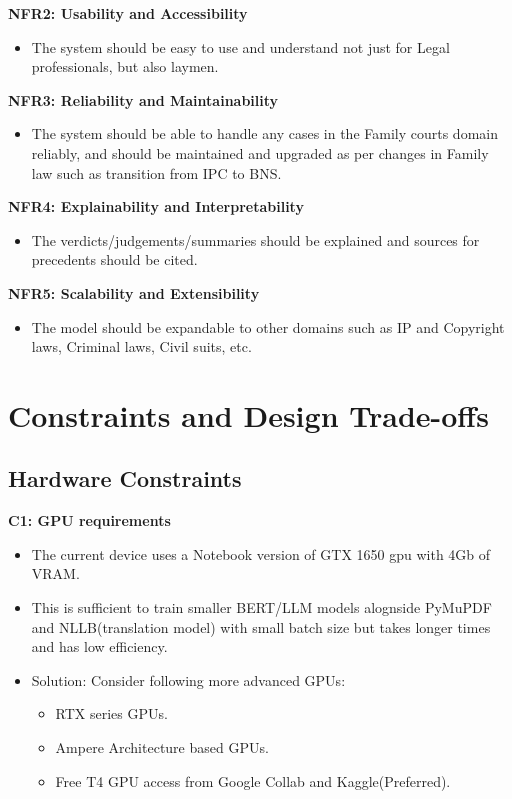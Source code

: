 \textbf{NFR2: Usability and Accessibility}
\begin{itemize}
    \item The system should be easy to use and understand not just for Legal professionals, but also laymen.
\end{itemize}

\textbf{NFR3: Reliability and Maintainability}
\begin{itemize}
    \item The system should be able to handle any cases in the Family courts domain reliably, and should be maintained and upgraded as per changes in Family law such as transition from IPC to BNS. 
\end{itemize}

\textbf{NFR4: Explainability and Interpretability}
\begin{itemize}
    \item The verdicts/judgements/summaries should be explained and sources for precedents should be cited.
\end{itemize}

\textbf{NFR5:  Scalability and Extensibility}
\begin{itemize}
	\item The model should be expandable to other domains such as IP and Copyright laws, Criminal laws, Civil suits, etc.
\end{itemize}


\section{Constraints and Design Trade-offs}

\subsection{Hardware Constraints}
\textbf{C1: GPU requirements}
\begin{itemize}
    \item The current device uses a Notebook version of GTX 1650 gpu with 4Gb of VRAM.
    \item This is sufficient to train smaller BERT/LLM models alognside PyMuPDF and NLLB(translation model) with small batch size but takes longer times and has low efficiency.
    \item Solution: Consider following more advanced GPUs:
    	\begin{itemize}
    		\item RTX series GPUs.
    		\item Ampere Architecture based GPUs.
    		\item Free T4 GPU access from Google Collab and Kaggle(Preferred).
    	\end{itemize}
    	
    	
\end{itemize}


